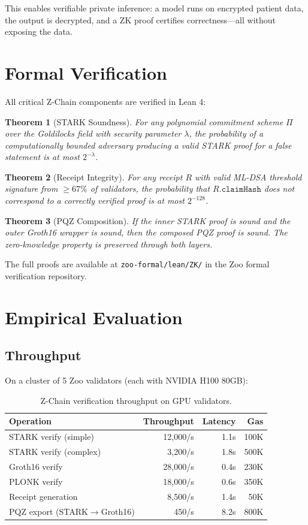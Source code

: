 \documentclass[11pt,a4paper]{article}
\newtheorem{theorem}{Theorem}
\begin{document}
This enables verifiable private inference: a model runs on encrypted patient data, the output is decrypted, and a ZK proof certifies correctness---all without exposing the data.

\section{Formal Verification}

All critical Z-Chain components are verified in Lean 4:

\begin{theorem}[STARK Soundness]
For any polynomial commitment scheme $\Pi$ over the Goldilocks field with security parameter $\lambda$, the probability of a computationally bounded adversary producing a valid STARK proof for a false statement is at most $2^{-\lambda}$.
\end{theorem}

\begin{theorem}[Receipt Integrity]
For any receipt $R$ with valid ML-DSA threshold signature from $\geq 67\%$ of validators, the probability that $R.\texttt{claimHash}$ does not correspond to a correctly verified proof is at most $2^{-128}$.
\end{theorem}

\begin{theorem}[PQZ Composition]
If the inner STARK proof is sound and the outer Groth16 wrapper is sound, then the composed PQZ proof is sound. The zero-knowledge property is preserved through both layers.
\end{theorem}

The full proofs are available at \texttt{zoo-formal/lean/ZK/} in the Zoo formal verification repository.

\section{Empirical Evaluation}

\subsection{Throughput}

On a cluster of 5 Zoo validators (each with NVIDIA H100 80GB):

\begin{table}[h]
\centering
\begin{tabular}{lrrr}
\toprule
\textbf{Operation} & \textbf{Throughput} & \textbf{Latency} & \textbf{Gas} \\
\midrule
STARK verify (simple) & 12,000/s & 1.1s & 100K \\
STARK verify (complex) & 3,200/s & 1.8s & 500K \\
Groth16 verify & 28,000/s & 0.4s & 230K \\
PLONK verify & 18,000/s & 0.6s & 350K \\
Receipt generation & 8,500/s & 1.4s & 50K \\
PQZ export (STARK$\to$Groth16) & 450/s & 8.2s & 800K \\
\bottomrule
\end{tabular}
\caption{Z-Chain verification throughput on GPU validators.}
\end{table}
\end{document}
